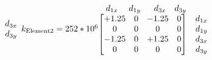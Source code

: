 \documentclass{article}
\begin{document}
\begin{math}
\begin{matrix}
\begin{matrix}
            d_{3x}\\
            d_{3y}\\
            \end{matrix}
        \end{matrix}
        \newline
        k_{\text{Element2}}=252*10^6
        \begin{matrix}
            \begin{matrix}
            \;\;\;d_{1x}&\;d_{1y}&\;\;d_{3x}&d_{3y}\\
            \end{matrix}\\
            \begin{bmatrix}
            +1.25 & 0 & -1.25 & 0\\
            0     & 0 & 0     & 0\\
            -1.25 & 0 & +1.25 & 0\\
            0     & 0 & 0     & 0\\
            \end{bmatrix}&
            \begin{matrix}
            d_{1x}\\
            d_{1y}\\
            d_{3x}\\
            d_{3y}\\
            \end{matrix}
        \end{matrix}
    \end{math}
\end{document}
